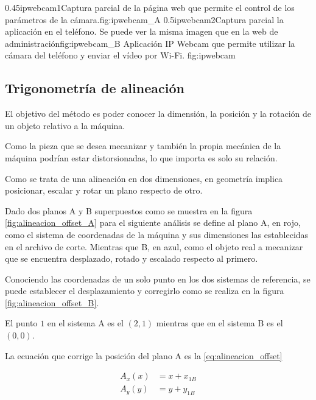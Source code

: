\subfigab
         {0.45}{ipwebcam1}{Captura parcial de la página web que permite el control de los parámetros de la cámara.}{fig:ipwebcam_A}
         {0.5}{ipwebcam2}{Captura parcial la aplicación en el teléfono. Se puede ver la misma imagen que en la web de administración}{fig:ipwebcam_B}
         {Aplicación IP Webcam que permite utilizar la cámara del teléfono y enviar el vídeo por Wi-Fi.}
         {fig:ipwebcam}


\subsection{Trigonometría de alineación}
\label{subsection:trigonometria}

   El objetivo del método es poder conocer la dimensión, la posición y la rotación de un objeto relativo a la máquina. \par

Como la pieza que se desea mecanizar y también la propia mecánica de la máquina podrían estar distorsionadas, lo que importa es solo su relación. \par

   Como se trata de una alineación en dos dimensiones, en geometría implica posicionar, escalar y rotar un plano respecto de otro.\par

   Dado dos planos A y B superpuestos como se muestra en la figura \ref{fig:alineacion_offset_A} para el siguiente análisis se define al plano A, en rojo, como el sistema de coordenadas de la máquina y sus dimensiones las establecidas en el archivo de corte.
   Mientras que B, en azul, como el objeto real a mecanizar que se encuentra desplazado, rotado y escalado respecto al primero.\par
   Conociendo las coordenadas de un solo punto en los dos sistemas de referencia, se puede establecer el desplazamiento y corregirlo como se realiza en la figura \ref{fig:alineacion_offset_B}.\par
   El punto $1$ en el sistema A es el $(2,1)$ mientras que en el sistema B es el $(0,0)$.\par
   La ecuación que corrige la posición del plano A es la \ref{eq:alineacion_offset}

   \begin{equation}
      \begin{aligned}
         A_x(x) &= x+x_{1B} \\
         A_y(y) &= y+y_{1B}
      \end{aligned}
      \label{eq:alineacion_offset}
   \end{equation}

